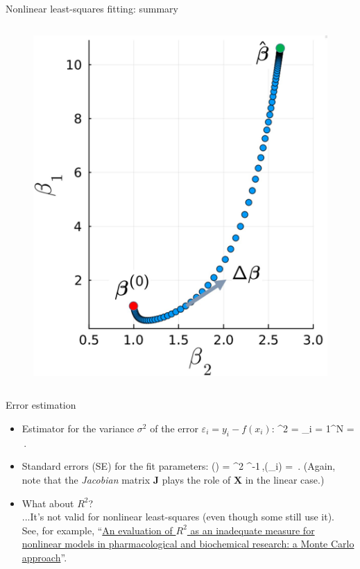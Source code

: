 \documentclass[10pt,aspectratio=169,handout]{beamer}
\begin{document}
\begin{frame}{Nonlinear least-squares fitting: summary}
\begin{columns}
\begin{figure}
			\includegraphics[width=\textwidth]{fig/beta_plot}
		\end{figure}
 
	\end{columns}
\end{frame}


\begin{frame}{Error estimation}
	\begin{itemize}[<+->]	
		\item Estimator for the variance $\sigma^2$ of the error $\varepsilon_i = y_i - f(x_i)$:
		\bea
		\sigmahat^2 = \sum_{i = 1}^N = \,.
		\eea
		\item Standard errors (SE) for the fit parameters:
		\bea
		(\hat{\vec{\beta}}) = \sigmahat^2  ^{-1}\,,\quad {}(\betahat_i) = \,.
		\eea
			 (Again, note that the \textit{Jacobian} matrix $\mathbf{J}$ plays the role of $\mathbf{X}$ in the linear case.)
		\item What about $R^2$?\pause \\
		  ...It's not valid for nonlinear least-squares (even though some still use it).\pause \\
		See, for example, ``\href{https://pmc.ncbi.nlm.nih.gov/articles/PMC2892436/}{An evaluation of $R^2$ as an inadequate measure for nonlinear models in pharmacological and biochemical research: a Monte Carlo approach}''.
		
		
	\end{itemize}

\end{frame}
\end{document}
